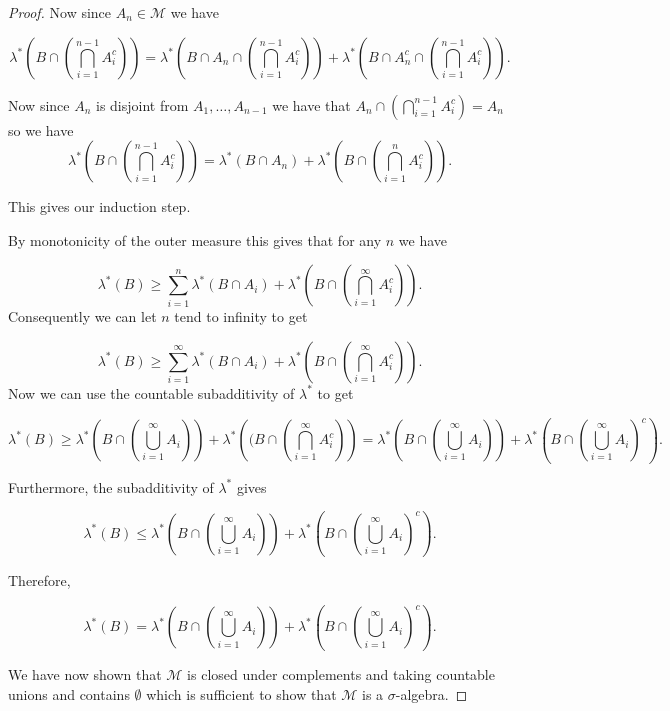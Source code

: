 \documentclass[
]{book}
\theoremstyle{definition}
\theoremstyle{definition}
\theoremstyle{definition}
\theoremstyle{definition}
\theoremstyle{remark}
\begin{document}
\begin{proof}
Now since \(A_n \in \mathscr{M}\) we have

\[ \lambda^*\left( B \cap \left( \bigcap_{i=1}^{n-1} A_i^c \right) \right) = \lambda^* \left(B \cap A_n \cap \left( \bigcap_{i=1}^{n-1} A_i^c \right)  \right) + \lambda^* \left( B \cap A_n^c \cap \left( \bigcap_{i=1}^{n-1} A_i^c \right) \right).\]

Now since \(A_n\) is disjoint from \(A_1, \dots, A_{n-1}\) we have that \(A_n \cap \left( \bigcap_{i=1}^{n-1} A_i^c \right) = A_n\) so we have
\[  \lambda^*\left( B \cap \left( \bigcap_{i=1}^{n-1} A_i^c \right) \right) = \lambda^*(B \cap A_n) + \lambda^*\left( B \cap \left( \bigcap_{i=1}^{n} A_i^c \right) \right). \]

This gives our induction step.

By monotonicity of the outer measure this gives that for any \(n\) we have

\[ \lambda^*(B) \geq \sum_{i=1}^n \lambda^*(B \cap A_i) + \lambda^* \left(B \cap \left( \bigcap_{i=1}^\infty A_i^c \right) \right). \]
Consequently we can let \(n\) tend to infinity to get

\[ \lambda^*(B) \geq \sum_{i=1}^\infty \lambda^*(B \cap A_i) +\lambda^* \left(B \cap \left( \bigcap_{i=1}^\infty A_i^c \right) \right). \]
Now we can use the countable subadditivity of \(\lambda^*\) to get

\[ \lambda^*(B) \geq \lambda^*\left( B \cap \left( \bigcup_{i=1}^\infty A_i \right)\right) + \lambda^*\left((B \cap \left( \bigcap_{i=1}^\infty A_i^c \right) \right) = \lambda^* \left( B \cap \left( \bigcup_{i=1}^\infty A_i \right) \right) + \lambda^* \left( B \cap \left( \bigcup_{i=1}^\infty A_i \right)^c \right).\]

Furthermore, the subadditivity of \(\lambda^*\) gives

\[ \lambda^*(B) \leq  \lambda^* \left( B \cap \left( \bigcup_{i=1}^\infty A_i \right) \right) + \lambda^* \left( B \cap \left( \bigcup_{i=1}^\infty A_i \right)^c \right). \]

Therefore,

\[ \lambda^*(B) =  \lambda^* \left( B \cap \left( \bigcup_{i=1}^\infty A_i \right) \right) + \lambda^* \left( B \cap \left( \bigcup_{i=1}^\infty A_i \right)^c \right). \]

We have now shown that \(\mathscr{M}\) is closed under complements and taking countable unions and contains \(\emptyset\) which is sufficient to show that \(\mathscr{M}\) is a \(\sigma\)-algebra.
\end{proof}
\end{document}
